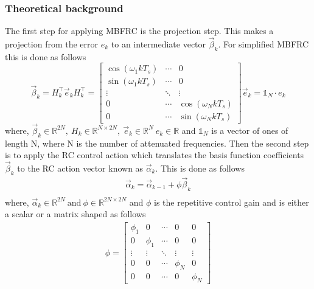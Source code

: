 \documentclass[journal]{IEEEtran}
\begin{document}
\subsubsection{Theoretical background}\label{sssec: SimplifiedMBFRC_Theory}
The first step for applying MBFRC is the projection step. This makes a projection from the error \(e_k\) to an intermediate vector \(\vec\beta_k\). For simplified MBFRC this is done as follows
\begin{subequations}\label{eq: ProjectionSimplifiedMBFRC}
\begin{equation}
\vec\beta_k = H_k^\top \vec e_k
    \end{equation}
    \begin{equation}
        H_k^\top = \begin{bmatrix}
            \cos(\omega_1 k T_s)  &\cdots & 0\\
            \sin(\omega_1 k T_s)&
        \cdots &0\\
        \vdots&\ddots&\vdots\\
        0&\cdots&\cos(\omega_N k T_s)\\
        0&\cdots &\sin(\omega_N k T_s)
        \end{bmatrix}
        \end{equation}
        \begin{equation}
        \vec e_k = \mathbb{1}_N\cdot e_k
\end{equation}
\end{subequations}
where, $\vec\beta_k\in\mathbb{R}^{2N}, \:H_k \in\mathbb{R}^{N\times 2N},\:\vec e_k \in\mathbb{R}^N\:e_k\in\mathbb{R}$ and \(\mathbb{1}_N\) is a vector of ones of length N, where N is the number of attenuated frequencies. Then the second step is to apply the RC control action which translates the basis function coefficients \(\vec\beta_k\) to the RC action vector known as \(\vec\alpha_k\). This is done as follows
\begin{equation}
    \begin{aligned}
        \vec\alpha_k = \vec\alpha_{k-1}+\phi\vec\beta_k\\
    \end{aligned}
\end{equation}
where, $\vec\alpha_k\in\mathbb{R}^{2N} \:\text{and}\:\phi\in\mathbb{R}^{2N\times 2N}$ and \(\phi\) is the repetitive control gain and is either a scalar or a matrix shaped as follows
\begin{equation}
    \begin{aligned}
        \phi = \begin{bmatrix}
            \phi_1&0&\cdots & 0 & 0\\
            0 & \phi_1 &\cdots&0&0\\
            \vdots & \vdots & \ddots & \vdots & \vdots\\
            0&0&\cdots&\phi_N&0\\
            0 & 0 & \cdots &0 & \phi_N
        \end{bmatrix}
    \end{aligned}
\end{equation}
\end{document}
